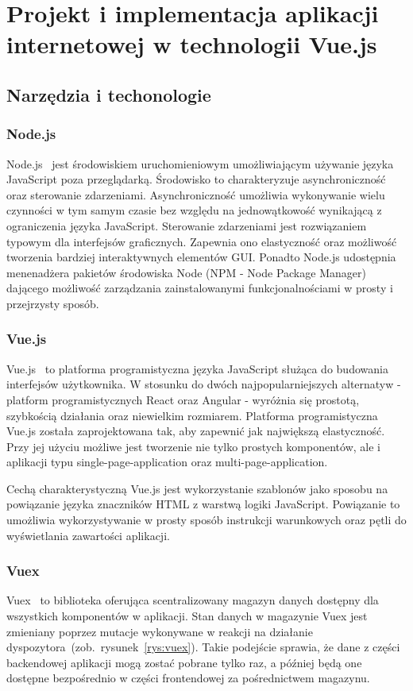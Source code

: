 
\chapter{Projekt i implementacja aplikacji internetowej w technologii Vue.js}
\section{Narzędzia i techonologie}
\subsection{Node.js}
Node.js~\cite{node} jest środowiskiem uruchomieniowym umożliwiającym używanie języka JavaScript poza przeglądarką. Środowisko to charakteryzuje asynchroniczność oraz sterowanie zdarzeniami. Asynchroniczność umożliwia wykonywanie wielu czynności w tym samym czasie bez względu na jednowątkowość wynikającą z ograniczenia języka JavaScript. Sterowanie zdarzeniami jest rozwiązaniem typowym dla interfejsów graficznych. Zapewnia ono elastyczność oraz możliwość tworzenia bardziej interaktywnych elementów GUI. Ponadto Node.js udostępnia menenadżera pakietów środowiska Node (NPM - Node Package Manager) dającego możliwość zarządzania zainstalowanymi funkcjonalnościami w prosty i przejrzysty sposób.
\subsection{Vue.js}
Vue.js~\cite{vue} to platforma programistyczna języka JavaScript służąca do budowania interfejsów użytkownika. W stosunku do dwóch najpopularniejszych alternatyw - platform programistycznych React oraz Angular - wyróżnia się prostotą, szybkością działania oraz niewielkim rozmiarem. Platforma programistyczna Vue.js została zaprojektowana tak, aby zapewnić jak największą elastyczność. Przy jej użyciu możliwe jest tworzenie nie tylko prostych komponentów, ale i aplikacji typu single-page-application oraz multi-page-application. 

Cechą charakterystyczną Vue.js jest wykorzystanie szablonów jako sposobu na powiązanie języka znaczników HTML z warstwą logiki JavaScript. Powiązanie to umożliwia wykorzystywanie w prosty sposób instrukcji warunkowych oraz pętli do wyświetlania zawartości aplikacji.   

\subsection{Vuex}
Vuex~\cite{vuex} to biblioteka oferująca scentralizowany magazyn danych dostępny dla wszystkich komponentów w aplikacji. Stan danych w magazynie Vuex jest zmieniany poprzez mutacje wykonywane w reakcji na działanie dyspozytora~(zob.~rysunek~\ref{rys:vuex}). Takie podejście sprawia, że dane z części backendowej aplikacji mogą zostać pobrane tylko raz, a później będą one dostępne bezpośrednio w części frontendowej za pośrednictwem magazynu.

